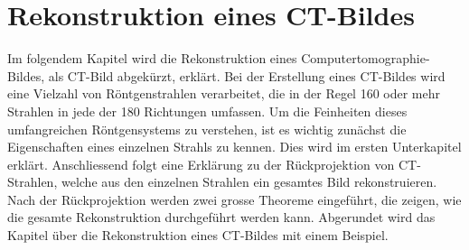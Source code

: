 %
%
%
%
\chapter{Rekonstruktion eines CT-Bildes \label{chapter:ct}}
\begin{refsection}

Im folgendem Kapitel wird die Rekonstruktion eines Computertomographie-Bildes, als CT-Bild abgekürzt, erklärt. 
Bei der Erstellung eines CT-Bildes wird eine Vielzahl von Röntgenstrahlen verarbeitet, die in der Regel 160 oder mehr Strahlen in jede der 180 Richtungen umfassen. 
Um die Feinheiten dieses umfangreichen Röntgensystems zu verstehen, ist es wichtig zunächst die Eigenschaften eines einzelnen Strahls zu kennen. Dies wird im ersten Unterkapitel erklärt. 
Anschliessend folgt eine Erklärung zu der Rückprojektion von CT-Strahlen, welche aus den einzelnen Strahlen ein gesamtes Bild rekonstruieren. 
Nach der Rückprojektion werden zwei grosse Theoreme eingeführt, die zeigen, wie die gesamte Rekonstruktion durchgeführt werden kann.
Abgerundet wird das Kapitel über die Rekonstruktion eines CT-Bildes mit einem Beispiel.






\printbibliography[heading=subbibliography]
\end{refsection}
